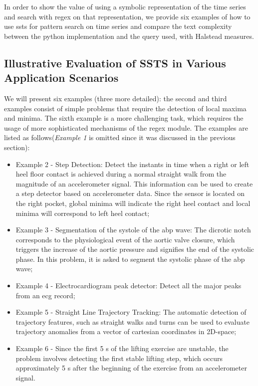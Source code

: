 In order to show the value of using a symbolic representation of the time series and search with \gls{regex} on that representation, we provide six examples of how to use \gls{ssts} for pattern search on time series and compare the text complexity between the python implementation and the query used, with Halstead measures. 

\subsection{Illustrative Evaluation of SSTS in Various Application Scenarios}

We will present six examples (three more detailed): the second and third examples consist of simple problems that require the detection of local maxima and minima. The sixth example is a more challenging task, which requires the usage of more sophisticated mechanisms of the \gls{regex} module. The examples are listed as follows(\textit{Example 1} is omitted since it was discussed in the previous section):

\begin{itemize}
\item Example 2 - Step Detection: Detect the instants in time when a right or left heel floor contact is achieved during a normal straight walk from the magnitude of an accelerometer signal. This information can be used to create a step detector based on accelerometer data. Since the sensor is located on the right pocket, global minima will indicate the right heel contact and local minima will correspond to left heel contact;

\item Example 3 - Segmentation of the systole of the \gls{abp} wave: The dicrotic notch corresponds to the physiological event of the aortic valve closure, which triggers the increase of the aortic pressure and signifies the end of the systolic phase. In this problem, it is asked to segment the systolic phase of the \gls{abp} wave;

\item Example 4 - Electrocardiogram peak detector: Detect all the major peaks from an \gls{ecg} record;

\item Example 5 - Straight Line Trajectory Tracking: The automatic detection of trajectory features, such as straight walks and turns can be used to evaluate trajectory anomalies from a vector of cartesian coordinates in 2D-space;

\item Example 6 - Since the first 5 s of the lifting exercise are unstable, the problem involves detecting the first stable lifting step, which occurs approximately 5 s after the beginning of the exercise from an accelerometer signal.

\end{itemize}

